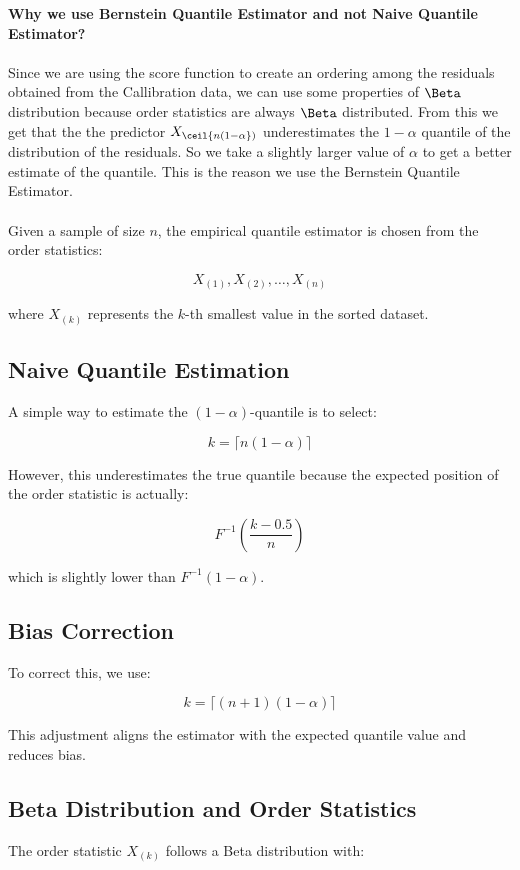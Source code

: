 \documentclass{article}
\begin{document}
\textbf{Why we use Bernstein Quantile Estimator and not Naive Quantile Estimator? \\\\}
Since we are using the score function to create an ordering among the residuals obtained from the Callibration data, we can use some properties of $\Beta$ distribution because order statistics are always $\Beta$ distributed. From this we get that the the predictor $X_{\ceil{n (1 - \alpha})}$ underestimates the $1-\alpha$ quantile of the distribution of the residuals. So we take a slightly larger value of $\alpha$ to get a better estimate of the quantile. This is the reason we use the Bernstein Quantile Estimator.\\\\
Given a sample of size \( n \), the empirical quantile estimator is chosen from the order statistics:

\[
X_{(1)}, X_{(2)}, \dots, X_{(n)}
\]

where \( X_{(k)} \) represents the \( k \)-th smallest value in the sorted dataset.

\subsection*{Naive Quantile Estimation}
A simple way to estimate the \( (1-\alpha) \)-quantile is to select:

\[
k = \lceil n(1 - \alpha) \rceil
\]

However, this underestimates the true quantile because the expected position of the order statistic is actually:

\[
F^{-1} \left( \frac{k - 0.5}{n} \right)
\]

which is slightly lower than \( F^{-1}(1 - \alpha) \).

\subsection*{Bias Correction}
To correct this, we use:

\[
k = \lceil (n+1)(1 - \alpha) \rceil
\]

This adjustment aligns the estimator with the expected quantile value and reduces bias.

\subsection*{Beta Distribution and Order Statistics}
The order statistic \( X_{(k)} \) follows a Beta distribution with:
\end{document}
